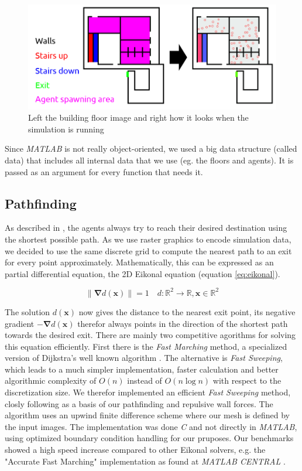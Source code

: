 \documentclass[11pt]{article}
\begin{document}
\begin{figure}[h]
\centering
\includegraphics[width=\textwidth]{config_floor_description.png}
\caption{Left the building floor image and right how it looks when the
simulation is running} 
\label{building floor image}
\end{figure}

Since \textit{MATLAB} is not really object-oriented, we used a big data structure (called
data) that includes all internal data that we use (eg. the floors and agents).
It is passed as an argument for every function that needs it.

\subsection{Pathfinding}
As described in \cite{SFMPD}, the agents always try to reach their desired destination using the shortest possible path. As we use raster graphics to encode simulation data, we decided to use the same discrete grid to compute the nearest path to an exit for every point approximately.
Mathematically, this can be expressed as an partial differential equation, the 2D Eikonal equation (equation \ref{eq:eikonal}).

\begin{equation} \label{eq:eikonal}
\|\mathbf{\nabla} d(\mathbf{x})\|=1 \quad d:\!\mathbb{R}^{2}\to\mathbb{R},\mathbf{x}\in\mathbb{R}^{2}
\end{equation}

The solution $d(\mathbf{x})$ now gives the distance to the nearest exit point, its negative gradient $-\mathbf{\nabla}d(\mathbf{x})$ therefor always points in the direction of the shortest path towards the desired exit. There are mainly two competitive agorithms for solving this equation efficiently. First there is the \textit{Fast Marching} method, a specialized version of Dijkstra's well known algorithm \cite{dijkstra59a}. The alternative is \textit{Fast Sweeping}, which leads to a much simpler implementation, faster calculation and better algorithmic complexity of $O(n)$ instead of $O(n\log n)$ with respect to the discretization size. We therefor implemented an efficient \textit{Fast Sweeping} method, closly following \cite{Zhao04afast} as a basis of our pathfinding and repulsive wall forces. The algorithm uses an upwind finite difference scheme where our mesh is defined by the input images. The implementation was done \textit{C} and not directly in \textit{MATLAB}, using optimized boundary condition handling for our pruposes. Our benchmarks showed a high speed increase compared to other Eikonal solvers, e.g. the "Accurate Fast Marching" implementation as found at \textit{MATLAB CENTRAL} \cite{fastmarching}.
\end{document}
